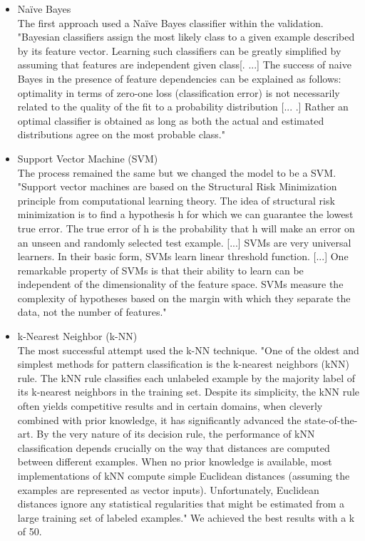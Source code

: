 \documentclass[11pt,titlepage,oneside,openany]{book}
\begin{document}
\begin{itemize}
\item Na\"{i}ve Bayes \\
The first approach used a Na\"{i}ve Bayes classifier within the validation. "Bayesian classifiers assign the most likely class to a given example described by its feature vector. Learning such classifiers can be greatly simplified by assuming that features are independent given class[. ...] The success of naive Bayes in the presence of feature dependencies can be explained as follows: optimality in terms of zero-one loss (classification error) is not necessarily related to the quality of the fit to a probability distribution [... .] Rather an optimal classifier is obtained as long as both the actual and estimated distributions agree on the most probable class." \citep[p.1]{Rish2001} 
\item Support Vector Machine (SVM) \\
The process remained the same but we changed the model to be a SVM. "Support vector machines are based on the Structural Risk Minimization principle from computational learning theory. The idea of structural risk minimization is to find a hypothesis h for which we can guarantee the lowest true error. The true error of h is the probability that h will make an error on an unseen and randomly selected test example. [...] SVMs are very universal learners. In their basic form, SVMs learn linear threshold function. [...] One remarkable property of SVMs is that their ability to learn can be independent of the dimensionality of the feature space. SVMs measure the complexity of hypotheses based on the margin with which they separate the data, not the number of features." \citep[p.2]{Joachims1998} 
\item k-Nearest Neighbor (k-NN) \\
The most successful attempt used the k-NN technique. "One of the oldest and simplest methods for pattern classification is the k-nearest neighbors (kNN) rule. The kNN rule classifies each unlabeled example by the majority label of its k-nearest neighbors in the training set. Despite its simplicity, the kNN rule often yields competitive results and in certain domains, when cleverly combined with prior knowledge, it has significantly advanced the state-of-the-art. By the very nature of its decision rule, the performance of kNN classification depends crucially on the way that distances are computed between different examples. When no prior knowledge is available, most implementations of kNN compute simple Euclidean distances (assuming the examples are represented as vector inputs). Unfortunately, Euclidean distances ignore any statistical regularities that might be estimated from a large training set of labeled examples." \citep[p.1]{Weinberger2006} We achieved the best results with a k of 50. 
\end{itemize}
\end{document}
